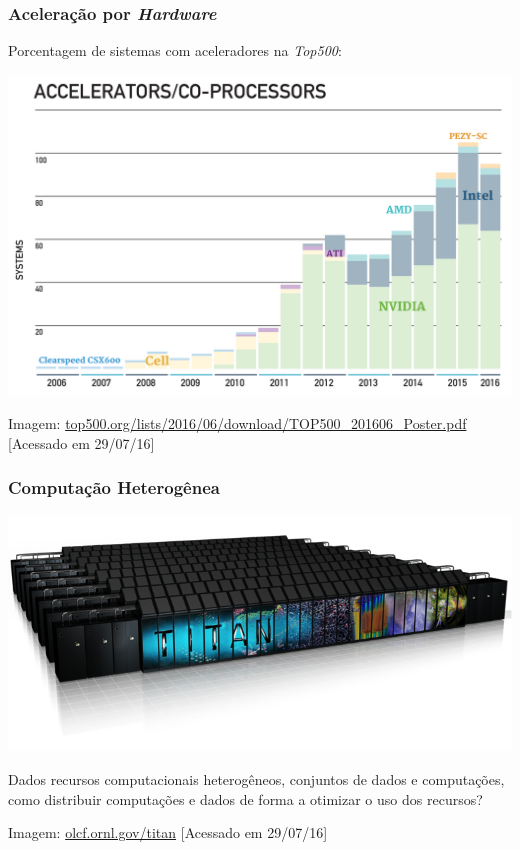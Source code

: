 \documentclass[10pt, compress]{beamer}
\begin{document}
\begin{frame}
    \frametitle{Aceleração por \textit{Hardware}}
    Porcentagem de sistemas com aceleradores na \textit{Top500}:

    \begin{center}
    \includegraphics[width=.95\textwidth]{top500_accel}
    \hfill

        \tiny{Imagem: \url{top500.org/lists/2016/06/download/TOP500_201606_Poster.pdf} [Acessado em 29/07/16]}
    \end{center}
\end{frame}

\begin{frame}
    \frametitle{Computação Heterogênea}
    \begin{center}
        \includegraphics[width=.7\textwidth]{titan}
    \end{center}

    Dados recursos computacionais \alert{heterogêneos}, conjuntos de
    \alert{dados} e \alert{computações}, como distribuir computações e dados de
    forma a \alert{otimizar o uso} dos recursos?
    \hfill

    \begin{center}
    \tiny{Imagem: \url{olcf.ornl.gov/titan} [Acessado em 29/07/16]}
    \end{center}
\end{frame}
\end{document}
